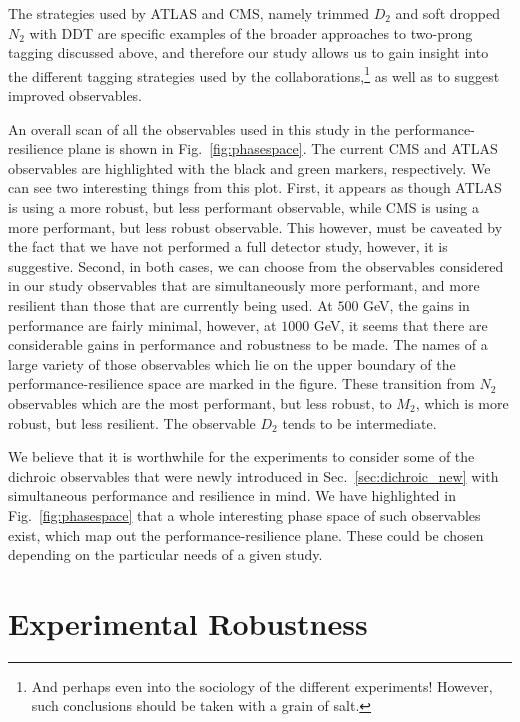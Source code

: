 \documentclass[11pt,letterpaper]{article}
\DeclareRobustCommand{\Sec}[1]{Sec.~\ref{#1}}
\DeclareRobustCommand{\Fig}[1]{Fig.~\ref{#1}}
\begin{document}
The strategies used by ATLAS and CMS, namely trimmed $D_2$ \cite{Larkoski:2015kga,Larkoski:2014gra} and soft dropped $N_2$ \cite{Moult:2016cvt} with DDT \cite{Dolen:2016kst} are specific examples of the broader approaches to two-prong tagging discussed above, and therefore our study allows us to gain insight into the different tagging strategies used by the collaborations,\footnote{And perhaps even into the sociology of the different experiments! However, such conclusions should be taken with a grain of salt.} as well as to suggest improved observables.

An overall scan of all the observables used in this study in the performance-resilience plane is shown in \Fig{fig:phasespace}. The current CMS and ATLAS observables are highlighted with the black and green markers, respectively. We can see two interesting things from this plot. First, it appears as though ATLAS is using a more robust, but less performant observable, while CMS is using a more performant, but less robust observable. This however, must be caveated by the fact that we have not performed a full detector study, however, it is suggestive. Second, in both cases, we can choose from the observables considered in our study observables that are simultaneously more performant, and more resilient than those that are currently being used. At $500$ GeV, the gains in performance are fairly minimal, however, at $1000$ GeV, it seems that there are considerable gains in performance and robustness to be made.
The names of a large variety of those observables which lie on the upper boundary of the performance-resilience space are marked in the figure. These transition from $N_2$ observables which are the most performant, but less robust, to $M_2$, which is more robust, but less resilient. The observable $D_2$ tends to be intermediate.

We believe that it is worthwhile for the experiments to consider some of the  dichroic observables that were newly introduced in \Sec{sec:dichroic_new} with simultaneous performance and resilience in mind. We have highlighted in \Fig{fig:phasespace} that a whole interesting phase space of such observables exist, which map out the performance-resilience plane. These could be chosen depending on the particular needs of a given study.








\section{Experimental Robustness}\label{sec:exp}
\end{document}
